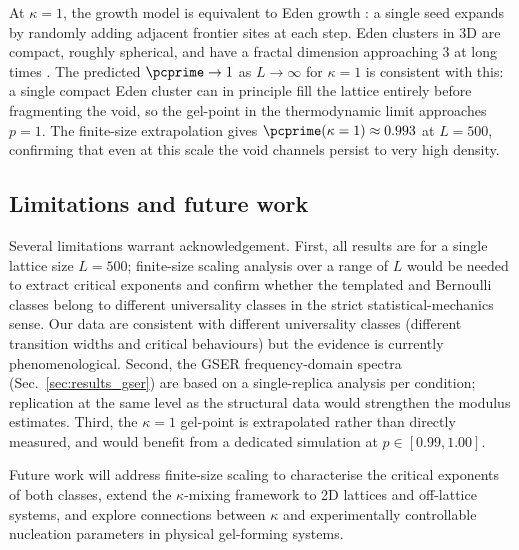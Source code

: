 At $\kappa = 1$, the growth model is equivalent to Eden growth \citep{Eden1961}: a single seed expands by randomly adding adjacent frontier sites at each step. Eden clusters in 3D are compact, roughly spherical, and have a fractal dimension approaching 3 at long times \citep{Jullien1985}. The predicted $\pcprime \to 1$ as $L \to \infty$ for $\kappa = 1$ is consistent with this: a single compact Eden cluster can in principle fill the lattice entirely before fragmenting the void, so the gel-point in the thermodynamic limit approaches $p = 1$. The finite-size extrapolation gives $\pcprime(\kappa=1) \approx 0.993$ at $L = 500$, confirming that even at this scale the void channels persist to very high density.

\subsection{Limitations and future work}

Several limitations warrant acknowledgement. First, all results are for a single lattice size $L = 500$; finite-size scaling analysis over a range of $L$ would be needed to extract critical exponents and confirm whether the templated and Bernoulli classes belong to different universality classes in the strict statistical-mechanics sense. Our data are consistent with different universality classes (different transition widths and critical behaviours) but the evidence is currently phenomenological. Second, the GSER frequency-domain spectra (Sec.~\ref{sec:results_gser}) are based on a single-replica analysis per condition; replication at the same level as the structural data would strengthen the modulus estimates. Third, the $\kappa = 1$ gel-point is extrapolated rather than directly measured, and would benefit from a dedicated simulation at $p \in [0.99, 1.00]$.

Future work will address finite-size scaling to characterise the critical exponents of both classes, extend the $\kappa$-mixing framework to 2D lattices and off-lattice systems, and explore connections between $\kappa$ and experimentally controllable nucleation parameters in physical gel-forming systems.

